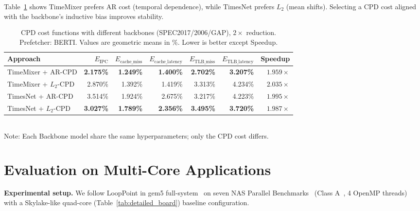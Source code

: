 \documentclass[conference]{IEEEtran}
\begin{document}
Table~\ref{tab:sensitivity_cpd_onecol} shows TimeMixer prefers AR cost (temporal dependence), while TimesNet prefers $L_2$ (mean shifts). Selecting a CPD cost aligned with the backbone’s inductive bias improves stability.
\begin{table}[htbp!]
  \caption{CPD cost functions with different backbones (SPEC2017/2006/GAP), $2\times$ reduction. Prefetcher: BERTI. Values are geometric means in \%. Lower is better except Speedup.}
  \label{tab:sensitivity_cpd_onecol}
  \centering
  \setlength{\tabcolsep}{2pt}
  \begin{adjustbox}{max width=1.0\columnwidth}
  \begin{tabular}{l|rrrrrr}
  \toprule
  Approach &  $E_{\text{IPC}}$  & $E_{\text{cache\_miss}}$  &$E_{\text{cache\_latency}}$  & $E_{\text{TLB\_miss}}$    & $E_{\text{TLB\_latency}}$   & Speedup\\
  \midrule
  \footnotesize TimeMixer + AR-CPD    & \textbf{2.175\%} & \textbf{1.249\%} & \textbf{1.400\%} & \textbf{2.702\%} & \textbf{3.207\%} & $1.959\times$ \\
  \footnotesize TimeMixer + $L_2$-CPD  & 2.870\% & 1.392\% & 1.419\% & 3.313\% & 4.234\% & \textbf{$2.035\times$} \\
  \midrule
  \footnotesize TimesNet + AR-CPD     & 3.514\% & 1.924\% & 2.675\% & 3.217\% & 4.223\% & $1.995\times$ \\
   \footnotesize TimesNet + $L_2$-CPD     & \textbf{3.027\%} & \textbf{1.789\%} & \textbf{2.356\%} & \textbf{3.495\%} & \textbf{3.720\%} & $1.987\times$ \\
  \bottomrule
  \end{tabular}
  \end{adjustbox}
  \vspace{0.25ex}
  \\
  \footnotesize Note: Each Backbone model share the same hyperparameters; only the CPD cost differs.
\end{table}

\section{Evaluation on Multi-Core Applications} 
\label{evaluation_mc}
\textbf{Experimental setup.} We follow LoopPoint in gem5 full-system~\cite{LoopPointTutorialHPCA23} on seven NAS Parallel Benchmarks~\cite{npb_benchmark} (Class A~\cite{npb_input_size}, 4 OpenMP threads) with a Skylake-like quad-core (Table~\ref{tab:detailed_board}) baseline configuration.
\end{document}

